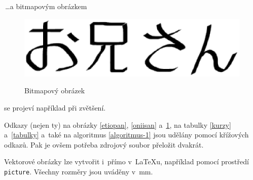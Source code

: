 \documentclass[11pt, a4paper, titlepage] {article}
\begin{document}
\noindent \,\ldots a bitmapovým obrázkem
\begin{figure}[ht]
\begin{center}
{
	\includegraphics[scale=0.6]{oniisan2.eps}
}
\caption{Bitmapový obrázek}
\label{oniisan2}
\end{center}
\end{figure}

\noindent 
se projeví například při zvětšení.

Odkazy (nejen ty) na obrázky \ref{etiopan}, \ref{oniisan} a~\ref{oniisan2}, na tabulky \ref{kurzy} a~\ref{tabulky} a~také na algoritmus \ref{algoritmus-1} jsou udělány pomocí křížových odkazů. Pak je ovšem potřeba zdrojový soubor přeložit dvakrát.

Vektorové obrázky lze vytvořit i~přímo v~\LaTeX u, například pomocí prostředí \texttt{picture}. Všechny rozměry jsou uváděny v~mm.
\end{document}
